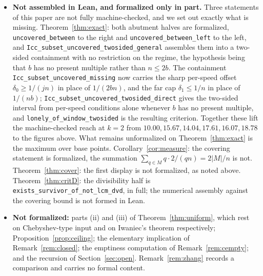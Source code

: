 \documentclass[11pt]{amsart}
\theoremstyle{plain}
\theoremstyle{definition}
\begin{document}
\begin{itemize}
present multiple and $\delta^{0}<1/(2bn)$, apply. The figures below are for the union of \texttt{lonely\_of\_window},
\texttt{lonely\_of\_criterion\_c'} and \texttt{lonely\_of\_one\_mem}. Counted exhaustively
over all $k$-subsets at $n=22,26,30,34,38,42$, what Lean certifies is
$38.10,32.00,37.93,42.42,35.14,39.02$ per cent at $k=1$; $11.90,18.33,16.50,20.83,19.52,21.83$ at
$k=2$; and $14.29,12.17,11.82,17.80,16.74,15.43$ at $k=3$, against the criterion's own
$38.10,36.00,41.38,42.42,37.84,41.46$; $21.43,19.33,23.89,21.78,24.77,22.44$; and
$14.44,13.13,11.88,18.37,16.82,15.55$.
\item \textbf{Not assembled in Lean, and formalized only in part.} Three statements of this paper
are not fully machine-checked, and we set out exactly what is missing.
Theorem~\ref{thm:exact}: both abutment halves are formalized, \texttt{uncovered\_between} to the
right and \texttt{uncovered\_between\_left} to the left, and
\texttt{Icc\_subset\_uncovered\_twosided\_general} assembles them into a two-sided containment with
no restriction on the regime, the hypothesis being that $b$ has no present multiple rather than
$n\le2b$. The containment \texttt{Icc\_subset\_uncovered\_missing} now carries the sharp per-speed offset
$\delta_0\ge1/(jn)$ in place of $1/(2bn)$, and the far cap $\delta_1\le1/n$ in place of $1/(nb)$;
\texttt{Icc\_subset\_uncovered\_twosided\_direct} gives the two-sided interval from per-speed
conditions alone whenever $b$ has no present multiple, and \texttt{lonely\_of\_window\_twosided} is
the resulting criterion. Together these lift the machine-checked reach at $k=2$ from
$10.00,15.67,14.04,17.61,16.07,18.78$ to the figures above. What remains unformalized on
Theorem~\ref{thm:exact} is the maximum over base points.
Corollary~\ref{cor:measure}: the covering statement is formalized, the summation
$\sum_{q\in M}q\cdot 2/(qn)=2|M|/n$ is not. Theorem~\ref{thm:cover}: the first display is not
formalized, as noted above. Theorem~\ref{thm:critD}: the divisibility half is
\texttt{exists\_survivor\_of\_not\_lcm\_dvd}, in full; the numerical assembly against the covering
bound is not formed in Lean.
\item \textbf{Not formalized:} parts (ii) and (iii) of Theorem~\ref{thm:uniform}, which rest on
Chebyshev-type input and on Iwaniec's theorem respectively; Proposition~\ref{prop:ceiling}; the
elementary implication of Remark~\ref{rem:closed}; the emptiness computation of
Remark~\ref{rem:cempty}; and the recursion of Section~\ref{sec:open}. Remark~\ref{rem:zhang}
records a comparison and carries no formal content.
\end{itemize}
\end{document}
